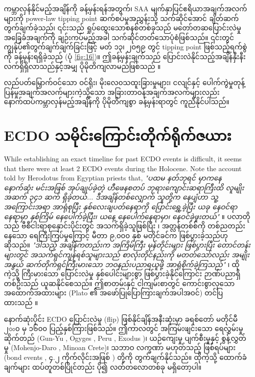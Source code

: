 \documentclass[10pt,twocolumn,letterpaper]{article}
\begin{document}
ကမ္ဘာလှန်နိုင်မည့်အချိန်ကို ခန့်မှန်းရန်အတွက်၊ SAA မျက်နှာပြင်ဧရိယာအချက်အလက်များကို power-law tipping point ဆက်စပ်မှုအညွှန်းသို့ သက်ဆိုင်အောင် ချိတ်ဆက်တွက်ချက်ခဲ့သည်၊ ၎င်းသည် ရှုပ်ထွေးသောစနစ်တစ်ခုသည် မတော်တဆပြောင်းလဲမှုအခြေခံအချက်ကို ချဉ်းကပ်မည့်အခါ သက်ဆိုင်တတ်သောပုံစံဖြစ်သည်။ ၎င်းတွင် ကျွန်ုပ်၏တွက်ချက်ချက်ခြင်းဖြင့် မတ် ၁၃၊ ၂၀၅၉ တွင် tipping point ဖြစ်သည့်ရက်စွဲကို ခန့်မှန်းရရှိခဲ့သည် (ပုံ \ref{fig:16})။ ဤခန့်မှန်းချက်သည် ပြောင်းလဲနိုင်သည့်အချိန်နှီးနီးလက်ရှိရှိလာသည်နှင့်အမျှ ပိုမိုတိကျလာမည်ဖြစ်သည် \cite{136}။

လည်ပတ်မြှောက်ဝင်သော ဝင်ရိုး၊ မိုးလေ၀သထူးခြားမှုများ၊ ငလျင်နှင့် ပေါက်ကွဲမှုတုန့်ပြန်မှုအချက်အလက်များကဲ့သို့သော အခြားတာဝန်အချက်အလက်များလည်း နောက်ထပ်ကမ္ဘာလှန်မည့်အချိန်ကို ပိုမိုတိကျစွာ ခန့်မှန်းရာတွင် ကူညီနိုင်ပါသည်။

\section{ECDO သမိုင်းကြောင်းတိုက်ရိုက်ဇယား}
While establishing an exact timeline for past ECDO events is difficult, it seems that there were at least 2 ECDO events during the Holocene. Note the account told by Herodotus from Egyptian priests that, \textit{"ပထမ နတ်ဘုရင် မှာကနေ နောက်ဆုံး မင်းအဖြစ် အုပ်ချုပ်ခဲ့တဲ့ ဟီဖေနစတပ် ဘုရားကျောင်းဆရာကြီးထိ လူမျိုးအဆက် ၃၄၁ ဆက် ရှိခဲ့တယ်... ဒီအချိန်တစ်လျှောက် သူတို့က နေပျံဟာ သူ့အကြောင်းအရာ အာရုံစုပြီး နှစ်လေးချပတ်နေရာကို ပြောင်းရွှေ့ခဲ့ပြီး ယခု နေဝင်ရာနေရာမှာ နှစ်ကြိမ် နေပေါက်ခဲ့ပြီး၊ ယနေ့ နေပေါက်နေရာမှာ၊ နေဝင်ခဲ့ဖူးတယ်"} \cite{32}။ ပလာတိုသည် ဗီစီငါးရာစုနှောင်းပိုင်းတွင် အသက်ရှိခဲ့သူဖြစ်ပြီး \cite{111}၊ အတ္လန်တစ်စ်ကို တစ်ညတည်း နေသော ရေကြီးကြပ်မှုကြောင့် မီတာ ၉,၀၀၀ နှစ် မတိုင်ခင်က ဖြစ်ပွားခဲ့သည်ဟု ဆိုသည်။ \textit{"ဒါသည့် အချိန်ကတည်းက အကြိမ်ကြီး မုန်တိုင်းများ ဖြစ်ပွားပြီး တောင်တန်းများတွင် အသက်ရှင်ကျန်ရစ်သူများသည် စာလုံးတိုင်နည်းကို မတတ်သော်လည်း အမျိုးအနွယ် ဆက်တိုက်ရှင်ကြီးမားသော ဘဝနည်းပညာရယူဖို့ အာရုံစိုက်ခဲ့ကြသည်"} \cite{112}၊ ထိုကဲ့သို့ ကြီးမားသော ပြောင်းလဲမှု နှစ်ပေါင်းများစွာ ဖြစ်ပွားခဲ့နိုင်ကြောင်း ဉာဏ်ပညာရှိ တစ်ဦးသည် ယူဆနိုင်စေသည်။ ဤစာတမ်းနှင့် ငါ့ကျမ်းစာတွင် ကောင်းစွာလှသော အထောက်အထားများ (Plato ၏ အဖော်ပြုပြောကြားချက်အပါအဝင်) တင်ပြထားသည် \cite{2}။

နောက်ဆုံးပိုင်း ECDO ပြောင်းလဲမှု (flip) ဖြစ်နိုင်ချိန်အနီးဆုံးမှာ ခရစ်တော် မတိုင်မီ ၂৩০၀ မှ ၁၆၀၀ ပြည့်နှစ်ကြားဖြစ်သည်။ ဤကာလတွင် အကြမ်းဖျင်းသော ရေလွှမ်းမှု ဆိုက်တည် (Gun-Yu \cite{113,114,115}, Ogyges \cite{116,117}, Peru \cite{118,119}, Exodus \cite{120})၊ ယဉ်ကျေးမှု ပျက်စီးမှုနှင့် စွန့်လွှတ်မှု (Mohenjo-Daro \cite{121}, Minoan Crete\cite{100,101})၊ သဘာဝ လက္ခဏာ မဟုတ်သည့် ဖြစ်ရပ်များ (bond events \cite{122}, ၄.၂ ကိုက်လိုင်းအဖြစ် \cite{90}) တို့ကို တွက်ချက်နိုင်သည်။ ထိုကဲ့သို့ ထောက်ခံချက်များ ထပ်တူတစ်ပြိုင်တည်း ပို၍ လတ်တလောတစ်ခု မရှိတော့ပါ။
\end{document}
